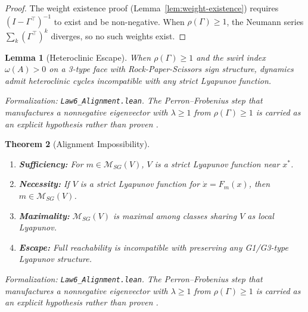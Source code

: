 \documentclass[12pt]{article}
\newtheorem{theorem}{Theorem}[section]
\newtheorem{lemma}[theorem]{Lemma}
\begin{document}
\begin{proof}
The weight existence proof (Lemma~\ref{lem:weight-existence}) requires $(I - \Gamma^\top)^{-1}$ to exist and be non-negative. When $\rho(\Gamma) \geq 1$, the Neumann series $\sum_k (\Gamma^\top)^k$ diverges, so no such weights exist.
\end{proof}

\begin{lemma}[Heteroclinic Escape]
\label{lem:heteroclinic}
When $\rho(\Gamma) \geq 1$ and the swirl index $\omega(A) > 0$ on a 3-type face with Rock-Paper-Scissors sign structure, dynamics admit heteroclinic cycles incompatible with any strict Lyapunov function.
\end{lemma}
\noindent\textit{Formalization: \texttt{Law6\_Alignment.lean}. The Perron--Frobenius step that manufactures a nonnegative eigenvector with $\lambda \geq 1$ from $\rho(\Gamma) \geq 1$ is carried as an explicit hypothesis rather than proven \citep{horn2012matrix}.}

\begin{theorem}[Alignment Impossibility]
\label{thm:alignment-impossibility}
\begin{enumerate}
    \item[(a)] \textbf{Sufficiency:} For $m \in \mathcal{M}_{SG}(V)$, $V$ is a strict Lyapunov function near $x^*$.
    \item[(b)] \textbf{Necessity:} If $V$ is a strict Lyapunov function for $\dot{x} = F_m(x)$, then $m \in \mathcal{M}_{SG}(V)$.
    \item[(c)] \textbf{Maximality:} $\mathcal{M}_{SG}(V)$ is maximal among classes sharing $V$ as local Lyapunov.
    \item[(d)] \textbf{Escape:} Full reachability is incompatible with preserving any G1/G3-type Lyapunov structure.
\end{enumerate}
\end{theorem}
\noindent\textit{Formalization: \texttt{Law6\_Alignment.lean}. The Perron--Frobenius step that manufactures a nonnegative eigenvector with $\lambda \geq 1$ from $\rho(\Gamma) \geq 1$ is carried as an explicit hypothesis rather than proven \citep{horn2012matrix}.}
\end{document}
